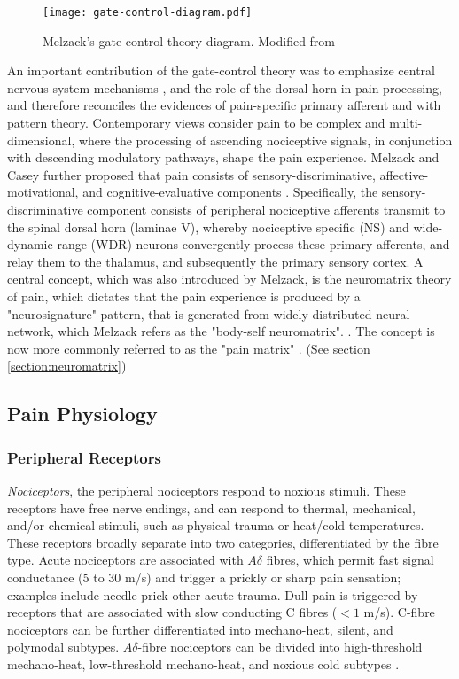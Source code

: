  \begin{figure}[ht]
 \texttt{[image: gate-control-diagram.pdf]}
 \centering
 \caption{Melzack's gate control theory diagram. Modified from \protect\cite{Melzack1965a}}
 \label{fig:gate-theory} 
 \end{figure}
 
An important contribution of the gate-control theory was to emphasize central nervous system mechanisms \cite{Melzack1999}, and the role of the dorsal horn in pain processing, and therefore reconciles the evidences of pain-specific primary afferent and with pattern theory. Contemporary views consider pain to be complex and multi-dimensional, where the processing of ascending nociceptive signals, in conjunction with descending modulatory pathways, shape the pain experience. Melzack and Casey further proposed that pain consists of sensory-discriminative, affective-motivational, and cognitive-evaluative components \cite{Melzack1968}. Specifically, the sensory-discriminative component consists of peripheral nociceptive afferents transmit to the spinal dorsal horn (laminae V), whereby nociceptive specific (NS) and wide-dynamic-range (WDR) neurons convergently process these primary afferents, and relay them to the thalamus, and subsequently the primary sensory cortex. A central concept, which was also introduced by Melzack, is the  neuromatrix theory of pain, which dictates that the pain experience is produced by a "neurosignature" pattern, that is generated from widely distributed neural network, which Melzack refers as the "body-self neuromatrix". \cite{Melzack1999}. The concept is now more commonly referred to as the "pain matrix" \cite{Tracey2007a}. (See section \ref{section:neuromatrix})


\subsection{Pain Physiology}

\subsubsection{Peripheral Receptors}

\textit{Nociceptors}, the peripheral nociceptors respond to noxious stimuli. These receptors have free nerve endings, and can respond to thermal, mechanical, and/or chemical stimuli, such as physical trauma or heat/cold temperatures. These receptors broadly separate into two categories, differentiated by the fibre type. Acute nociceptors are associated with $A\delta$ fibres, which permit fast signal conductance (5 to 30 m/s) and trigger a prickly or sharp pain sensation; examples include needle prick other acute trauma. Dull pain is triggered by receptors that are associated with slow conducting C fibres ($<1$ m/s). C-fibre nociceptors can be further differentiated into mechano-heat, silent, and polymodal subtypes. $A\delta$-fibre nociceptors can be divided into high-threshold mechano-heat, low-threshold mechano-heat, and noxious cold subtypes \cite{Julius2013}.

